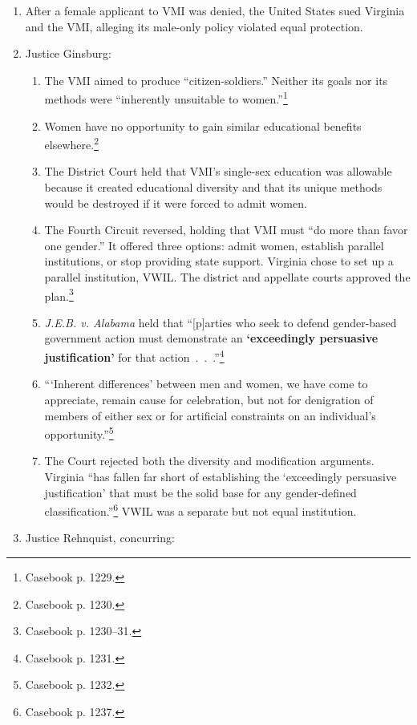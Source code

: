 \begin{enumerate}
    \item After a female applicant to VMI was denied, the United States sued 
    Virginia and the VMI, alleging its male-only policy violated equal 
    protection.
    \item Justice Ginsburg:
    \begin{enumerate}
        \item The VMI aimed to produce ``citizen-soldiers.'' Neither its goals 
        nor its methods were ``inherently unsuitable to 
        women.''\footnote{Casebook p. 1229.}
        \item Women have no opportunity to gain similar educational benefits 
        elsewhere.\footnote{Casebook p. 1230.}
        \item The District Court held that VMI's single-sex education was 
        allowable because it created educational diversity and that its unique 
        methods would be destroyed if it were forced to admit women.
        \item The Fourth Circuit reversed, holding that VMI must ``do more 
        than favor one gender.'' It offered three options: admit women, 
        establish parallel institutions, or stop providing state support. 
        Virginia chose to set up a parallel institution, VWIL. The district 
        and appellate courts approved the plan.\footnote{Casebook p. 1230--31.}
        \item \emph{J.E.B. v. Alabama} held that ``[p]arties who seek to 
        defend gender-based government action must demonstrate an 
        \textbf{`exceedingly persuasive justification'} for that 
        action~.~.~.''\footnote{Casebook p. 1231.}
        \item ```Inherent differences' between men and women, we have come to 
        appreciate, remain cause for celebration, but not for denigration of 
        members of either sex or for artificial constraints on an individual's 
        opportunity.''\footnote{Casebook p. 1232.}
        \item The Court rejected both the diversity and modification 
        arguments. Virginia ``has fallen far short of establishing the 
        `exceedingly persuasive justification' that must be the solid base for 
        any gender-defined classification.''\footnote{Casebook p. 1237.} VWIL 
        was a separate but not equal institution.
    \end{enumerate}
    \item Justice Rehnquist, concurring:

\end{enumerate}

